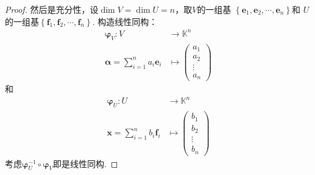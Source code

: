 {\begin{proof}
        然后是充分性，设$\dim V=\dim U=n$，取$V$的一组基
        $\left\{\bm{e}_1,\bm{e}_2,\cdots,\bm{e}_n\right\}$和
        $U$的一组基$\left\{\bm{f}_1,\bm{f}_2,\cdots,\bm{f}_n\right\}$.
        构造线性同构：
        \begin{align*}
            \bm{\varphi}_V:
            V & \longrightarrow \mathbb{K}^n \\
            \bm{\alpha} =
            \sum_{i = 1}^{n}a_i\bm{e}_i
              & \longmapsto \begin{pmatrix}
                                a_1    \\
                                a_2    \\
                                \vdots \\
                                a_n
                            \end{pmatrix}
        \end{align*}
        和
        \begin{align*}
            \bm{\varphi}_U:
            U & \longrightarrow \mathbb{K}^n \\
            \bm{x} =
            \sum_{i = 1}^{n}b_i\bm{f}_i
              & \longmapsto \begin{pmatrix}
                                b_1    \\
                                b_2    \\
                                \vdots \\
                                b_n
                            \end{pmatrix}
        \end{align*}
        考虑$\bm{\varphi}_U^{-1}\circ \bm{\varphi}_V$即是线性同构.
    \end{proof}
}

